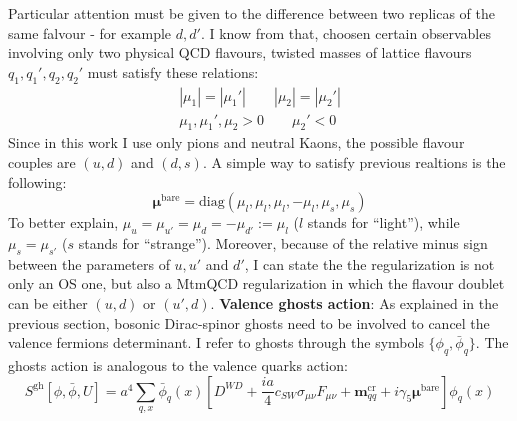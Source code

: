 \documentclass[english, LaM, oneside, noexaminfo]{sapthesis}
\newcommand{\bare}{^{\text{bare}}}
\begin{document}
Particular attention must be given to the difference between two replicas of the same falvour - for example $d,d'$.
I know from \cite{FR2} that, choosen certain observables involving only two physical QCD flavours, twisted masses of lattice flavours $q_1,q_1',q_2,q_2'$ must satisfy these relations:
\begin{equation*}
    \begin{gathered}
        |\mu_1| = |\mu_1 '| \qquad |\mu_2| = |\mu_2 '| \\
        \mu_1, \mu_1 ', \mu_2 > 0 \qquad \mu_2 '<0
    \end{gathered}
\end{equation*}
Since in this work I use only pions and neutral Kaons, the possible flavour couples are $(u,d)$ and $(d,s)$.
A simple way to satisfy previous realtions is the following:
\begin{equation*}
    \boldsymbol{\mu}\bare = \text{diag}\left(\mu_l,\mu_l,\mu_l,-\mu_l,\mu_s,\mu_s\right)
\end{equation*}
To better explain, $\mu_u = \mu_{u'} = \mu_d = -\mu_{d'} := \mu_l$ ($l$ stands for ``light''), while $\mu_s = \mu_{s'}$ ($s$ stands for ``strange'').
Moreover, because of the relative minus sign between the parameters of $u,u'$ and $d'$, I can state the the regularization is not only an OS one, but also a MtmQCD regularization in which the flavour doublet can be either $(u,d)$ or $(u',d)$.
\newline\newline
{\bf Valence ghosts action}:
As explained in the previous section, bosonic Dirac-spinor ghosts need to be involved to cancel the valence fermions determinant.
I refer to ghosts through the symbols $\{\phi_q,\bar\phi_q\}$.
The ghosts action is analogous to the valence quarks action:
\begin{equation}\label{eq:ghost-action}
    S^{\text{gh}}[\phi, \bar\phi, U] = a^4 \sum_{q,x} \bar \phi_q (x) \left[ D^{WD} + \frac{ia}{4}c_{SW}\sigma_{\mu\nu}\hat F_{\mu\nu} + \boldsymbol{m}^\text{cr}_{qq} + i\gamma_5\boldsymbol{\mu}\bare \right] \phi_q (x)
\end{equation}
\end{document}
